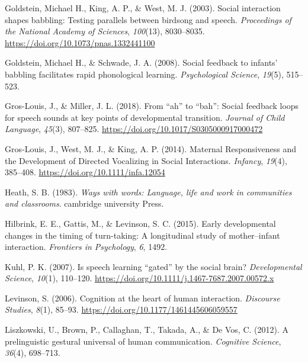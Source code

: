 \documentclass[
  man]{apa6}
\newlength{\cslhangindent}
\newlength{\cslentryspacingunit} %
\newenvironment{CSLReferences}[2] %
 {%
  \setlength{\parindent}{0pt}
  \ifodd #1
  \let\oldpar\par
  \def\par{\hangindent=\cslhangindent\oldpar}
  \fi
  \setlength{\parskip}{#2\cslentryspacingunit}
 }%
 {}
\begin{document}
\begin{CSLReferences}{1}{0}
\leavevmode{}%
Goldstein, Michael H., King, A. P., \& West, M. J. (2003). Social interaction shapes babbling: {Testing} parallels between birdsong and speech. \emph{Proceedings of the National Academy of Sciences}, \emph{100}(13), 8030--8035. \url{https://doi.org/10.1073/pnas.1332441100}

\leavevmode{}%
Goldstein, Michael H., \& Schwade, J. A. (2008). Social feedback to infants' babbling facilitates rapid phonological learning. \emph{Psychological Science}, \emph{19}(5), 515--523.

\leavevmode{}%
Gros-Louis, J., \& Miller, J. L. (2018). From {``ah''} to {``bah''}: Social feedback loops for speech sounds at key points of developmental transition. \emph{Journal of Child Language}, \emph{45}(3), 807--825. \url{https://doi.org/10.1017/S0305000917000472}

\leavevmode{}%
Gros‐Louis, J., West, M. J., \& King, A. P. (2014). Maternal {Responsiveness} and the {Development} of {Directed} {Vocalizing} in {Social} {Interactions}. \emph{Infancy}, \emph{19}(4), 385--408. \url{https://doi.org/10.1111/infa.12054}

\leavevmode{}%
Heath, S. B. (1983). \emph{Ways with words: Language, life and work in communities and classrooms}. cambridge university Press.

\leavevmode{}%
Hilbrink, E. E., Gattis, M., \& Levinson, S. C. (2015). Early developmental changes in the timing of turn-taking: A longitudinal study of mother--infant interaction. \emph{Frontiers in Psychology}, \emph{6}, 1492.

\leavevmode{}%
Kuhl, P. K. (2007). Is speech learning {``gated''} by the social brain? \emph{Developmental Science}, \emph{10}(1), 110--120. \url{https://doi.org/10.1111/j.1467-7687.2007.00572.x}

\leavevmode{}%
Levinson, S. (2006). Cognition at the heart of human interaction. \emph{Discourse Studies}, \emph{8}(1), 85--93. \url{https://doi.org/10.1177/1461445606059557}

\leavevmode{}%
Liszkowski, U., Brown, P., Callaghan, T., Takada, A., \& De Vos, C. (2012). A prelinguistic gestural universal of human communication. \emph{Cognitive Science}, \emph{36}(4), 698--713.


\end{CSLReferences}
\end{document}
